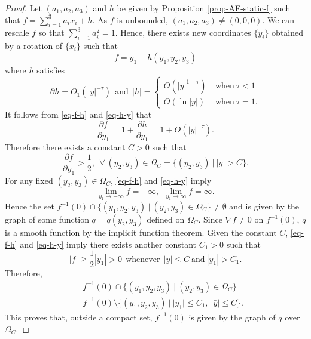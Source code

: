 \documentclass[12pt]{amsart}
\theoremstyle{remark}
\numberwithin{equation}{section}
\newcommand{\be}{\begin{equation}}
\newcommand{\ee}{\end{equation}}
\newcommand{\bee}{\begin{equation*}}
\newcommand{\eee}{\end{equation*}}
\def\p{\partial}
\def\lf{\left}
\def\ri{\right}
\begin{document}
\begin{proof}
Let $(a_1, a_2, a_3) $ and $h$ be given by  Proposition \ref{prop-AF-static-f} such that
$ f = \sum_{i=1}^3  a_i x_i + h $. As $f$ is unbounded,    $(a_1, a_2, a_3) \neq (0, 0, 0)$.
We can rescale $f$ so that $\sum_{i=1}^3 a_i^2 = 1 $.
Hence, there exists new coordinates $ \{ y_i \}$ obtained by a rotation of $ \{ x_i \}$  such that
\be  \label{eq-f-h}
f = y_1 + h (y_1, y_2, y_3)
\ee
where $h$ satisfies
\be \label{eq-h-y}
\p h = O _1( | y |^{-\tau} ) \ \ \mathrm{and} \ \
| h | =
\lf\{
\begin{array}{ll}
O( |y|^{1-\tau}) & \  \mathrm{when} \   \tau < 1 \\
 O ( \ln |y| ) & \  \mathrm{when}   \ \tau = 1 .
 \end{array}
 \ri.
\ee
It follows from \eqref{eq-f-h} and \eqref{eq-h-y} that
$$ \frac{\p f}{\p y_1} = 1 + \frac{\p h}{\p y_1}  =  1 + O ( | y |^{ - \tau } ) . $$
Therefore there exists a constant $C > 0 $ such that
$$ \frac{\p f}{\p y_1} > \frac12,  \ \ \forall \  (y_2, y_3) \in \Omega_{C} = \{ ( y_2, y_3) \ | \ | \bar{y} | > C \} . $$
For any fixed $ (y_2, y_3) \in \Omega_{C}$,  \eqref{eq-f-h} and \eqref{eq-h-y} imply
$$ \lim_{y_1 \rightarrow -\infty} f = - \infty, \ \ \lim_{y_1 \rightarrow \infty} f = \infty . $$
Hence the set
$   f^{-1}(0) \cap \{ (y_1, y_2, y_3) \ | \ (y_2, y_3) \in \Omega_{C}  \} \neq \emptyset $
and  is  given by the graph of some function $ q = q (y_2, y_3) $ defined on  $ \Omega_C$.
Since $ \nabla f \neq 0$ on $ f^{-1} (0)$, $ q $ is a smooth function by the implicit function theorem.
Given the constant $ C$, \eqref{eq-f-h} and  \eqref{eq-h-y} imply there exists another constant $ C_1 > 0 $ such that
$$ | f | \ge  \frac12 | y_1 | > 0  \ \ \mathrm{whenever} \ \ | \bar{y}| \le C \ \mathrm{and}  \ | y_1 | > C_1 . $$
Therefore,
\bee
\begin{split}
& \   f^{-1}(0) \cap \{ (y_1, y_2, y_3) \ | \ (y_2, y_3) \in \Omega_{C}  \}  \\
 = & \  f^{-1}(0) \setminus  \{ (y_1, y_2, y_3) \ | \ | y_1 | \le C_1,  \ | \bar{y} | \le C   \}.
\end{split}
\eee
This proves that, outside a  compact set,  $f^{-1} (0)$ is given by the graph of $ q $ over $ \Omega_C$.


\end{proof}
\end{document}
